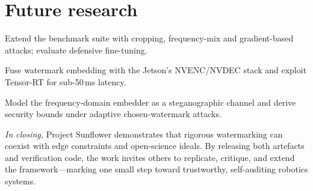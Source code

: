 \section*{Future research}

\begin{description}[leftmargin=1.8cm]
    \item[Adversarial robustness] Extend the benchmark suite with cropping,
    frequency-mix and gradient-based attacks; evaluate defensive fine-tuning.
    \item[Video-rate pipeline] Fuse watermark embedding with the Jetson’s
    NVENC/NVDEC stack and exploit Tensor-RT for sub-50\,ms latency.
    \item[Formal proofs] Model the frequency-domain embedder as a
    steganographic channel and derive security bounds under adaptive
    chosen-watermark attacks.
\end{description}

\bigskip
\noindent\textit{In closing,} Project Sunflower demonstrates that rigorous
watermarking can coexist with edge constraints and open-science ideals.
By releasing both artefacts and verification code, the work invites
others to replicate, critique, and extend the framework—marking one small
step toward trustworthy, self-auditing robotics systems.